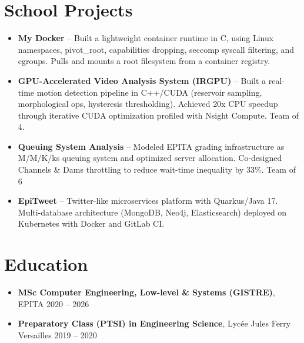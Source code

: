 \documentclass[9pt,a4paper]{article}
\begin{document}
\section*{School Projects}
\begin{tcolorbox}[mybox]
\begin{itemize}
\item \textbf{My Docker} -- Built a lightweight container runtime in C, using Linux namespaces, pivot\_root, capabilities dropping, seccomp syscall filtering, and cgroups. Pulls and mounts a root filesystem from a container registry.

\item \textbf{GPU-Accelerated Video Analysis System (IRGPU)} -- Built a real-time motion detection pipeline in C++/CUDA (reservoir sampling, morphological ops, hysteresis thresholding). Achieved 20x CPU speedup through iterative CUDA optimization profiled with Nsight Compute. Team of 4.

\item \textbf{Queuing System Analysis} -- Modeled EPITA grading infrastructure as M/M/K/ks queuing system and optimized server allocation. Co-designed Channels \& Dams throttling to reduce wait-time inequality by 33\%. Team of 6

\item \textbf{EpiTweet} -- Twitter-like microservices platform with Quarkus/Java 17. Multi-database architecture (MongoDB, Neo4j, Elasticsearch) deployed on Kubernetes with Docker and GitLab CI.
\end{itemize}
\end{tcolorbox}


\section*{Education}
\begin{tcolorbox}[mybox]
\begin{itemize}
\item \textbf{MSc Computer Engineering, Low-level \& Systems (GISTRE)}, EPITA {\small{\hfill 2020 – 2026}}

\item \textbf{Preparatory Class (PTSI) in Engineering Science}, Lycée Jules Ferry Versailles {\small{\hfill 2019 – 2020}}
\end{itemize}
\end{tcolorbox}
\end{document}
